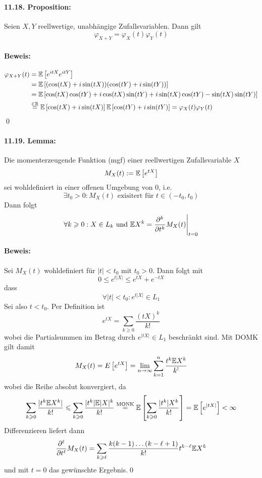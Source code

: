 \documentclass[11pt]{report}
\begin{document}
\paragraph{11.18. Proposition:} Seien $X,Y$ reellwertige, unabh\"angige Zufallsvariablen. Dann gilt
$$\varphi_{X+Y}=\varphi_X(t)\varphi_Y(t)$$

\paragraph{Beweis:}
\begin{align*}
    \varphi_{X+Y}(t)&=\mathbb{E}\left[e^{itX}e^{itY}\right] \\
    &=\mathbb{E}\left[(\cos(tX)+i\sin(tX))(\cos(tY)+i\sin(tY))\right] \\
    &=\mathbb{E}\left[\cos(tX)\cos(tY)+i\cos(tX)\sin(tY)+i\sin(tX)\cos(tY)-\sin(tX)\sin(tY)\right] \\
    &\overset{\in\mathbb{R}}{=}\mathbb{E}\left[\cos(tX)+i\sin(tX)\right]\mathbb{E}\left[\cos(tY)+i\sin(tY)\right]=\varphi_X(t)\varphi_Y(t)
\end{align*}\qed

\paragraph{11.19. Lemma:} Die momenterzeugende Funktion (mgf) einer reellwertigen Zufallsvariable $X$
$$M_X(t):=\mathbb{E}\left[e^{tX}\right]$$
sei wohldefiniert in einer offenen Umgebung von $0$, i.e. 
$$\exists t_0>0:M_X(t)\text{ exisitert f\"ur } t\in(-t_0,t_0)$$
Dann folgt
$$\forall k\geqslant0:X\in L_k \text{ und }\mathbb{E} X^k=\dfrac{\partial^k}{\partial t^k}M_X(t)\Bigg|_{t=0}$$

\paragraph{Beweis:} Sei $M_X(t)$ wohldefiniert f\"ur $|t|<t_0$ mit $t_0>0$. Dann folgt mit
$$0\leq e^{t|X|}\leq e^{tX}+e^{-tX}$$
dass
$$\forall |t|<t_0:e^{t|X|}\in L_1$$
Sei also $t<t_0$. Per Definition ist 
$$e^{tX}=\sum_{k\geq0}\dfrac{(tX)^k}{k!}$$
wobei die Partialsummen im Betrag durch $e^{|tX|}\in L_1$ beschr\"ankt sind. Mit DOMK gilt damit 
$$M_X(t)=\\E\left[e^{tX}\right]=\lim_{n\to\infty}\sum_{k=1}^n\dfrac{t^k\mathbb{E} X^k}{k^!}$$
wobei die Reihe absolut konvergiert, da
$$\sum_{k\geqslant0}\dfrac{|t^k\mathbb{E} X^k|}{k!}\leqslant\sum_{k\geqslant0}\dfrac{|t^k|\mathbb{E} |X|^k}{k!}\overset{\text{MONK}}{=}\mathbb{E}\left[\sum_{k\geqslant0}\dfrac{|t^k|X^k}{k!}\right]=\mathbb{E}\left[ e^{|tX|}\right]<\infty$$
Differenzieren liefert dann
$$\dfrac{\partial^\ell}{\partial t^\ell}M_X(t)=\sum_{k\geqslant\ell}\dfrac{k(k-1)\hdots(k-\ell+1)}{k!}t^{k-\ell}\mathbb{E} X^k$$
und mit $t=0$ das gew\"unschte Ergebnis.\qed
\end{document}
